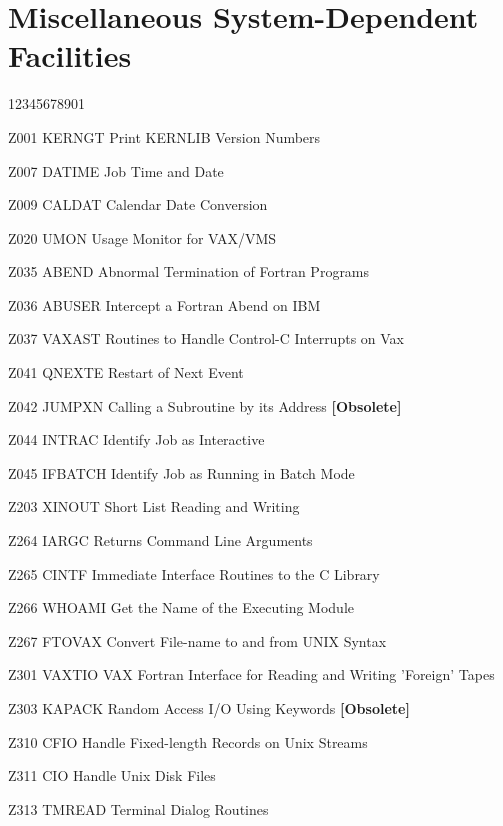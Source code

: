 \section*{Miscellaneous System-Dependent Facilities}
\begin{DLtt}{12345678901}
\item[Z001 KERNGT] Print KERNLIB Version Numbers
\item[Z007 DATIME] Job Time and Date
\item[Z009 CALDAT] Calendar Date Conversion
\item[Z020 UMON] Usage Monitor for VAX/VMS
\item[Z035 ABEND] Abnormal Termination of Fortran Programs
\item[Z036 ABUSER] Intercept a Fortran Abend on IBM
\item[Z037 VAXAST] Routines to Handle Control-C Interrupts on Vax
\item[Z041 QNEXTE] Restart of Next Event
\item[Z042 JUMPXN] Calling a Subroutine by its Address {\bf [Obsolete]}
\item[Z044 INTRAC] Identify Job as Interactive
\item[Z045 IFBATCH] Identify Job as Running in Batch Mode
\item[Z203 XINOUT] Short List Reading and Writing
\item[Z264 IARGC] Returns Command Line Arguments
\item[Z265 CINTF] Immediate Interface Routines to the C Library
\item[Z266 WHOAMI] Get the Name of the Executing Module
\item[Z267 FTOVAX] Convert File-name to and from UNIX Syntax
\item[Z301 VAXTIO] VAX Fortran Interface for Reading and
Writing 'Foreign' Tapes
\item[Z303 KAPACK] Random Access I/O Using Keywords {\bf [Obsolete]}
\item[Z310 CFIO] Handle Fixed-length Records on Unix Streams
\item[Z311 CIO] Handle Unix Disk Files
\item[Z313 TMREAD] Terminal Dialog Routines
\end{DLtt}

